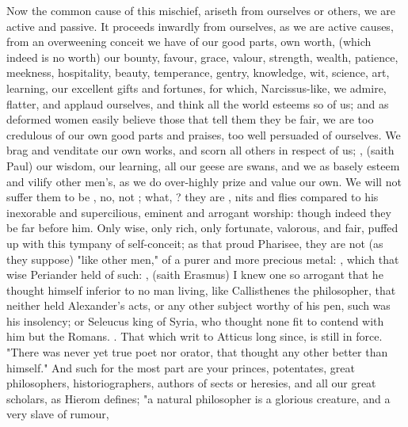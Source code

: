 Now the common cause of this mischief, ariseth from ourselves or others,
we are active and passive. It proceeds inwardly from
ourselves, as we are active causes, from an overweening conceit we have of our
good parts, own worth, (which indeed is no worth) our bounty, favour, grace,
valour, strength, wealth, patience, meekness, hospitality, beauty, temperance,
gentry, knowledge, wit, science, art, learning, our
excellent gifts and fortunes, for which, Narcissus-like,
we admire, flatter, and applaud ourselves, and think all the world esteems so
of us; and as deformed women easily believe those that tell them they be fair,
we are too credulous of our own good parts and praises, too well persuaded of
ourselves. We brag and venditate our own works, and scorn
all others in respect of us; , (saith Paul) our wisdom,
our learning, all our geese are swans, and we as basely
esteem and vilify other men's, as we do over-highly prize and value our own. We
will not suffer them to be , no, not ; what,
? they are ,
nits and flies compared to his inexorable and supercilious, eminent and
arrogant worship: though indeed they be far before him. Only wise, only rich,
only fortunate, valorous, and fair, puffed up with this tympany of
self-conceit; as that proud Pharisee, they are not (as
they suppose) "like other men," of a purer and more precious metal:
, which that wise
Periander held of such: , \etc{}  (saith Erasmus) I knew
one so arrogant that he thought himself inferior to no man living, like
Callisthenes the philosopher, that neither held
Alexander's acts, or any other subject worthy of his pen, such was his
insolency; or Seleucus king of Syria, who thought none fit to contend with him
but the Romans. . That which \Tully{} writ to Atticus long since, is still in
force. "There was never yet true poet nor orator, that
thought any other better than himself." And such for the most part are your
princes, potentates, great philosophers, historiographers, authors of sects or
heresies, and all our great scholars, as Hierom defines;
"a natural philosopher is a glorious creature, and a very slave of rumour,
